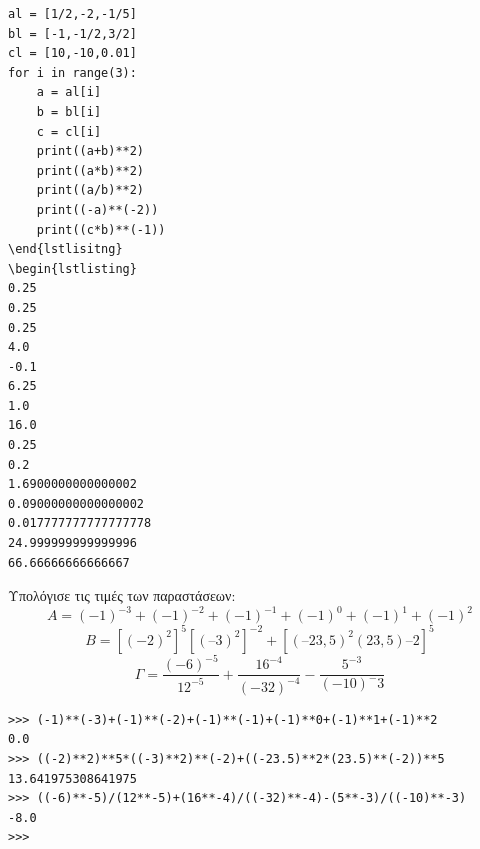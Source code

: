 \begin{lstlisting}
al = [1/2,-2,-1/5]
bl = [-1,-1/2,3/2]
cl = [10,-10,0.01]
for i in range(3):
    a = al[i]
    b = bl[i]
    c = cl[i]
    print((a+b)**2)
    print((a*b)**2)
    print((a/b)**2)
    print((-a)**(-2))
    print((c*b)**(-1))
\end{lstlisitng}
\begin{lstlisting}
0.25
0.25
0.25
4.0
-0.1
6.25
1.0
16.0
0.25
0.2
1.6900000000000002
0.09000000000000002
0.017777777777777778
24.999999999999996
66.66666666666667
\end{lstlisting}
\begin{exercise}
Υπολόγισε	τις	τιμές	των	παραστάσεων:
$$Α	=	(-1)^{-3}+(-1)^{-2}+(-1)^{-1}+(-1)^0+(-1)^1+(-1)^2$$
$$Β	=	[(-2)^2]^5[(–3)^2]^{-2}+[(–23,5)^2(23,5)–2]^5$$
$$\Gamma = \frac{(-6)^{-5}}{12^{-5}}+\frac{16^{-4}}{(-32)^{-4}}-\frac{5^{-3}}{(-10)^-3}$$
\end{exercise}
\begin{lstlisting}
>>> (-1)**(-3)+(-1)**(-2)+(-1)**(-1)+(-1)**0+(-1)**1+(-1)**2
0.0
>>> ((-2)**2)**5*((-3)**2)**(-2)+((-23.5)**2*(23.5)**(-2))**5
13.641975308641975
>>> ((-6)**-5)/(12**-5)+(16**-4)/((-32)**-4)-(5**-3)/((-10)**-3)
-8.0
>>>
\end{lstlisting}
